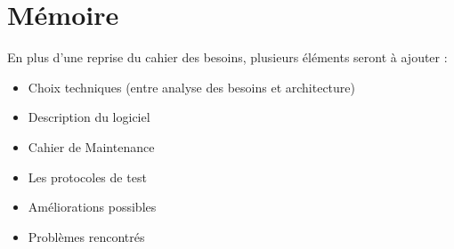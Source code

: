 \documentclass[french]{article}
\begin{document}
\section{Mémoire}

En plus d'une reprise du cahier des besoins, plusieurs éléments seront à ajouter :

\begin{itemize}
    \item Choix techniques (entre analyse des besoins et architecture)
    \item Description du logiciel
    \item Cahier de Maintenance
    \item Les protocoles de test
    \item Améliorations possibles
    \item Problèmes rencontrés
\end{itemize}{}

\end{document}
